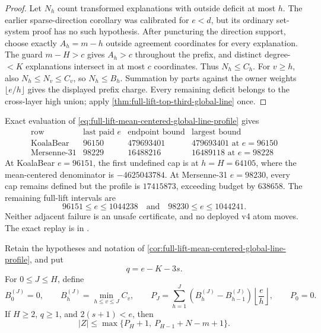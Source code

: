 \documentclass[11pt,a4paper]{amsart}
\numberwithin{equation}{section}
\theoremstyle{remark}
\begin{document}
\begin{proof}
Let $N_h$ count transformed explanations with outside deficit at most
$h$.  The earlier sparse-direction corollary was calibrated for $e<d$,
but its ordinary set-system proof has no such hypothesis.  After puncturing
the direction support, choose exactly $A_h=m-h$ outside agreement
coordinates for every explanation.  The guard $m-H>c$ gives $A_h>c$
throughout the prefix, and distinct degree-$<K$ explanations intersect in
at most $c$ coordinates.  Thus $N_h\le C_h$.  For $v\ge h$, also
$N_h\le N_v\le C_v$, so $N_h\le B_h$.  Summation by parts against the
owner weights $\lfloor e/h\rfloor$ gives the displayed prefix charge.
Every remaining deficit belongs to the cross-layer high union; apply
\cref{thm:full-lift-top-third-global-line} once.
\end{proof}

\begin{remark}
Exact evaluation of
\eqref{eq:full-lift-mean-centered-global-line-profile} gives
\[
\begin{array}{c|r|r|r}
\text{row}&\text{last paid }e&\text{endpoint bound}&\text{largest bound}\\ \hline
\text{KoalaBear}&96150&479693401&479693401\text{ at }e=96150\\
\text{Mersenne-31}&98229&16488216&16489118\text{ at }e=98228
\end{array}
\]
At KoalaBear $e=96151$, the first undefined cap is at $h=H=64105$,
where the mean-centered denominator is $-4625043784$.  At Mersenne-31
$e=98230$, every cap remains defined but the profile is
$17415873$, exceeding budget by $638658$.  The remaining full-lift
intervals are
\[
 96151\le e\le1044238
 \quad\text{and}\quad
 98230\le e\le1044241.
\]
Neither adjacent failure is an unsafe certificate, and no deployed v4 atom
moves.  The exact replay is in
.
\end{remark}

\begin{corollary}
\label{cor:full-lift-boundary-anchor-continuation}
Retain the hypotheses and notation of
\cref{cor:full-lift-mean-centered-global-line-profile}, and put
\[
 q=e-K-3s.
\]
For $0\le J\le H$, define
\[
 B^{(J)}_0=0,
 \qquad B^{(J)}_h=\min_{h\le v\le J}C_v,
 \qquad
 P_J=\sum_{h=1}^{J}
       (B^{(J)}_h-B^{(J)}_{h-1})
       \left\lfloor\frac eh\right\rfloor,
 \qquad P_0=0.
\]
If $H\ge2$, $q\ge1$, and $2(s+1)<e$, then
\begin{equation}
 |Z|\le\max\{P_H+1,\ P_{H-1}+N-m+1\}.
 \label{eq:full-lift-boundary-anchor-continuation}
\end{equation}
\end{corollary}
\end{document}
